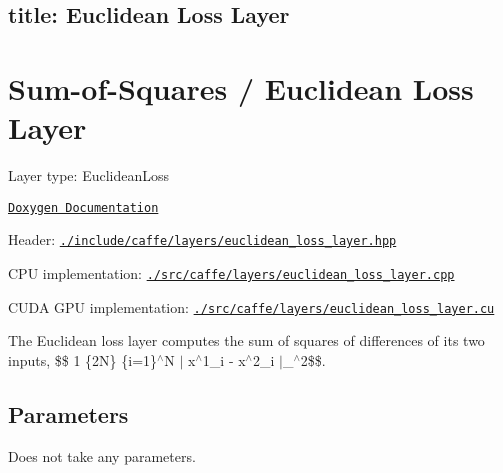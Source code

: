

 \subsection*{title\+: Euclidean Loss Layer }

\section*{Sum-\/of-\/\+Squares / Euclidean Loss Layer}


\begin{DoxyItemize}
\item Layer type\+: {\ttfamily Euclidean\+Loss}
\item \href{http://caffe.berkeleyvision.org/doxygen/classcaffe_1_1EuclideanLossLayer.html}{\tt Doxygen Documentation}
\item Header\+: \href{https://github.com/BVLC/caffe/blob/master/include/caffe/layers/euclidean_loss_layer.hpp}{\tt {\ttfamily ./include/caffe/layers/euclidean\+\_\+loss\+\_\+layer.hpp}}
\item C\+PU implementation\+: \href{https://github.com/BVLC/caffe/blob/master/src/caffe/layers/euclidean_loss_layer.cpp}{\tt {\ttfamily ./src/caffe/layers/euclidean\+\_\+loss\+\_\+layer.cpp}}
\item C\+U\+DA G\+PU implementation\+: \href{https://github.com/BVLC/caffe/blob/master/src/caffe/layers/euclidean_loss_layer.cu}{\tt {\ttfamily ./src/caffe/layers/euclidean\+\_\+loss\+\_\+layer.cu}}
\end{DoxyItemize}

The Euclidean loss layer computes the sum of squares of differences of its two inputs, \$\$ 1 \{2N\} \{i=1\}$^\wedge$N $|$ x$^\wedge$1\+\_\+i -\/ x$^\wedge$2\+\_\+i $|$\+\_$^\wedge$2\$\$.

\subsection*{Parameters}

Does not take any parameters. 